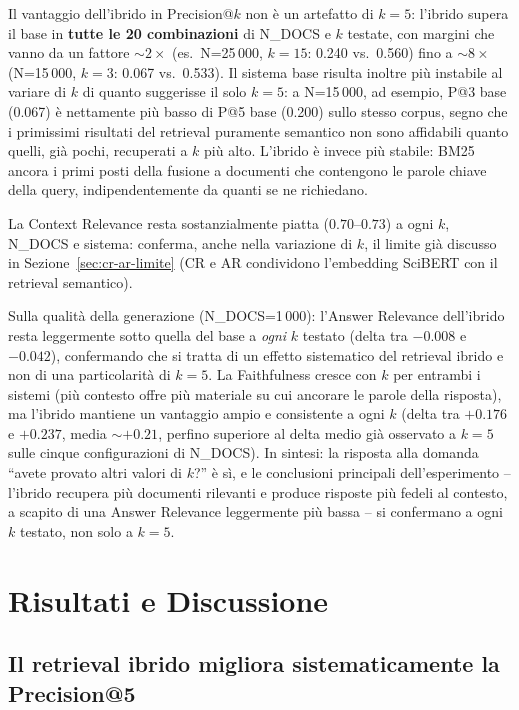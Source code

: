 \documentclass[12pt,a4paper]{article}
\begin{document}
Il vantaggio dell'ibrido in Precision@$k$ non \`e un artefatto di $k=5$: l'ibrido supera il base in \textbf{tutte le 20 combinazioni} di N\_DOCS e $k$ testate, con margini che vanno da un fattore ${\sim}2\times$ (es.\ N=25\,000, $k=15$: 0.240 vs.\ 0.560) fino a ${\sim}8\times$ (N=15\,000, $k=3$: 0.067 vs.\ 0.533). Il sistema base risulta inoltre pi\`u instabile al variare di $k$ di quanto suggerisse il solo $k=5$: a N=15\,000, ad esempio, P@3 base (0.067) \`e nettamente pi\`u basso di P@5 base (0.200) sullo stesso corpus, segno che i primissimi risultati del retrieval puramente semantico non sono affidabili quanto quelli, gi\`a pochi, recuperati a $k$ pi\`u alto. L'ibrido \`e invece pi\`u stabile: BM25 ancora i primi posti della fusione a documenti che contengono le parole chiave della query, indipendentemente da quanti se ne richiedano.

La Context Relevance resta sostanzialmente piatta ($0.70$--$0.73$) a ogni $k$, N\_DOCS e sistema: conferma, anche nella variazione di $k$, il limite gi\`a discusso in Sezione~\ref{sec:cr-ar-limite} (CR e AR condividono l'embedding SciBERT con il retrieval semantico).

Sulla qualit\`a della generazione (N\_DOCS=1\,000): l'Answer Relevance dell'ibrido resta leggermente sotto quella del base a \emph{ogni} $k$ testato (delta tra $-0.008$ e $-0.042$), confermando che si tratta di un effetto sistematico del retrieval ibrido e non di una particolarit\`a di $k=5$. La Faithfulness cresce con $k$ per entrambi i sistemi (pi\`u contesto offre pi\`u materiale su cui ancorare le parole della risposta), ma l'ibrido mantiene un vantaggio ampio e consistente a ogni $k$ (delta tra $+0.176$ e $+0.237$, media ${\sim}+0.21$, perfino superiore al delta medio gi\`a osservato a $k=5$ sulle cinque configurazioni di N\_DOCS). In sintesi: la risposta alla domanda ``avete provato altri valori di $k$?'' \`e s\`i, e le conclusioni principali dell'esperimento -- l'ibrido recupera pi\`u documenti rilevanti e produce risposte pi\`u fedeli al contesto, a scapito di una Answer Relevance leggermente pi\`u bassa -- si confermano a ogni $k$ testato, non solo a $k=5$.

\section{Risultati e Discussione}

\subsection{Il retrieval ibrido migliora sistematicamente la Precision@5}
\end{document}
